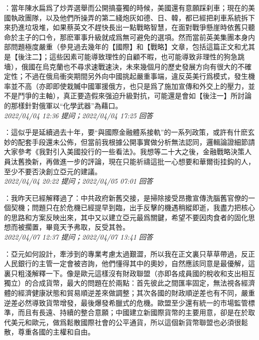 \documentclass[twocolumn]{ctexart}
\begin{document}
：當年陳水扁爲了炒弄選舉而公開搞臺獨的時候，美國還有意願踩刹車；現在的美國執政團隊，以及他們所操弄的第二綫炮灰如德、日、韓，都已經把刹車系統拆下來扔進垃圾堆，如果蔡英文不趕快長出一點戰略智慧，在面對戰爭懸崖時依舊只聽命於主子的口令，那麽軍事升級就成爲無可避免的選項。然而當前英美集團本身内部問題極度嚴重（參見過去幾年的【國際】和【戰略】文章，包括這篇正文和尤其是【後注二】；這些因素可能導致理性的自顧不暇，也可能導致非理性的狗急跳墻），俄國在烏克蘭也不尋求速戰速決，未來幾個月的歷史發展方向有很大的不確定性；不過在俄烏衝突期間另外向中國挑起嚴重事端，違反英美行爲模式，發生機率並不高（亦即即使栽贓中國軍援俄方，也只是爲了施加宣傳和外交上的壓力，並不是鬥爭的主軸），真正要造假來强迫升級對抗，可能還是會如【後注一】所討論的那樣針對俄軍以“化學武器”為藉口。
\\

\textit{\hfill\noindent\small 2022/04/04 12:36 提问；2022/04/04 17:25 回答}

：這似乎是延續過去十年，要“與國際金融體系接軌”的一系列政策，或許有什麽玄妙的配套手段還未公佈，但當前我根據公開事實做分析無法認同，邏輯論證細節請大家參考《我對引入美國投行的一些看法》。我想等二十大之後，金融戰略決策人員汰舊換新，再做進一步的評論，現在只能祈禱這批一心想要和華爾街挂鈎的人，至少不要否決創立亞元的建議。
\\

\textit{\hfill\noindent\small 2022/04/04 20:22 提问；2022/04/05 07:01 回答}

：我昨天已經解釋過了：中共政府新舊交接，是掃除接受昂撒宣傳洗腦舊官僚的一個契機；問題只在於危機已經提早到臨，出手反擊的機遇稍縱即逝，我盡力把核心的思路和方案反映出來，其中又以建立亞元最爲關鍵，希望不要因肉食者的固化思想而被擱置，畢竟天予弗取，反受其咎。
\\

\textit{\hfill\noindent\small 2022/04/07 12:37 提问；2022/04/07 13:41 回答}

：亞元如何設計，牽涉到的專業考慮太過艱澀，所以我在正文裏只草草帶過，反正人民銀行的主管一定會被咨詢，他們懂得其中的奧妙，自然應該同意是最優解，這裏只粗淺解釋一下。像是歐元這樣沒有財政聯盟（亦即各成員國的稅收和支出相互獨立）的合成貨幣，最大的問題在於兩點：首先彼此之間匯率固定，無法視各經濟體的經濟健康狀態和貿易順逆差來做調整；其次各國的財政順逆差也有不同，嚴重逆差必然導致貨幣增發，最後爆發希臘式的危機。歐盟至少還有統一的市場監管標準，而且有長遠、持續的整合意願；中國建立新國際貨幣的主要用意，卻是在於取代美元和歐元，做爲鬆散國際社會的公平通貨，所以這個新貨幣聯盟也必須很鬆散，尊重各國的主權和自由。
\end{document}
